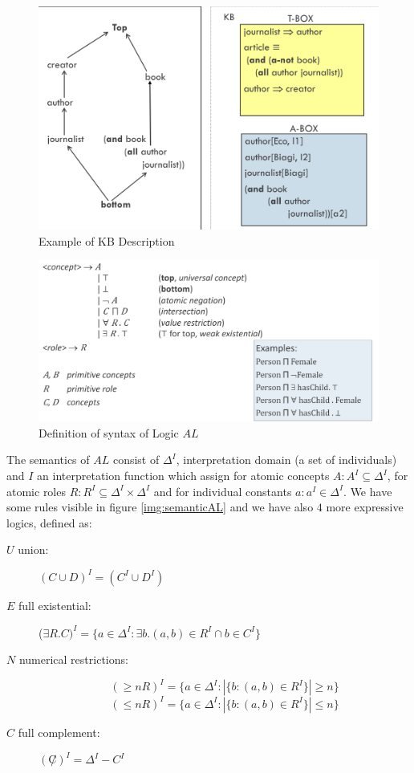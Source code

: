 \begin{figure}
	\includegraphics[width=\textwidth]{Images/exampleKB}
	\caption{Example of KB Description}
	\label{img:kbDescription}
\end{figure}
\begin{figure}
	\includegraphics[width=\textwidth]{Images/logicAL}
	\caption{Definition of syntax of Logic $AL$}
	\label{img:logicAL}
\end{figure}
The semantics of $AL$ consist of $\Delta^I$, interpretation domain (a set of individuals) 
and $I$ an interpretation function which assign for atomic concepts 
$A: A^I \subseteq \Delta^I$, for atomic roles $R: R^I \subseteq \Delta^I \times \Delta^I$
and for individual constants $a: a^I \in \Delta^I$.\newline
We have some rules visible in figure \ref{img:semanticAL} and we have also $4$ 
more expressive logics, defined as:
\begin{description}
   \item [$U$ union: ] $(C \cup D)^I = (C^I \cup D^I)$ 
   \item [$E$ full existential: ] ($\exists R.C)^I = \{ a \in \Delta^I : \exists b. (a, b)
	                          \in R^I \cap b \in C^I \}$
   \item [$N$ numerical restrictions: ] 
	   \[ (\geq n R)^I = \{ a \in \Delta^I : |\{b : (a, b) \in R^I\}| \geq n\} \]
	   \[ (\leq n R)^I = \{ a \in \Delta^I : |\{b : (a, b) \in R^I\}| \leq n\} \]
   \item [$C$ full complement: ] $(\not C)^I = \Delta ^ I - C^I$
\end{description}
